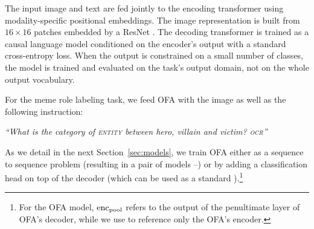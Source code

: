 The input image and text are fed jointly to the encoding transformer using modality-specific positional embeddings.
The image representation is built from \(16\times16\) patches embedded by a ResNet \citep{resnet}.
The decoding transformer is trained as a causal language model conditioned on the encoder's output with a standard cross-entropy loss.
When the output is constrained on a small number of classes, the model is trained and evaluated on the task's output domain, not on the whole output vocabulary.

For the meme role labeling task, we feed OFA  with the image as well as the following instruction:
\begin{trivlist}\item\relax
\em ``What is the category of \textsc{entity} between hero, villain and victim? \textsc{ocr}''
\end{trivlist}
As we detail in the next Section~\ref{sec:models}, we train OFA either as a sequence to sequence problem (resulting in a pair of models --) or by adding a classification head on top of the decoder (which can be used as a standard \encoder[pool]).\footnote{For the OFA model, \(\encoder[pool]\) refers to the output of the penultimate layer of OFA's decoder, while we use  to reference only the OFA's encoder.}
